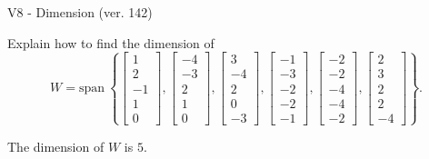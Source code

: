\begin{exercise}
  \begin{exerciseTitle}V8 - Dimension (ver. 142)\end{exerciseTitle}
  \begin{exerciseStatement}
    Explain how to find the dimension of 
\[W=\mathrm{span}\ \left\{\left[\begin{array}{r}
1 \\
2 \\
-1 \\
1 \\
0
\end{array}\right] , \left[\begin{array}{r}
-4 \\
-3 \\
2 \\
1 \\
0
\end{array}\right] , \left[\begin{array}{r}
3 \\
-4 \\
2 \\
0 \\
-3
\end{array}\right] , \left[\begin{array}{r}
-1 \\
-3 \\
-2 \\
-2 \\
-1
\end{array}\right] , \left[\begin{array}{r}
-2 \\
-2 \\
-4 \\
-4 \\
-2
\end{array}\right] , \left[\begin{array}{r}
2 \\
3 \\
2 \\
2 \\
-4
\end{array}\right]\right\}.\]



  \end{exerciseStatement}
  \begin{exerciseAnswer}
   The dimension of \(W\) is  \(5\).
  


  \end{exerciseAnswer}
\end{exercise}